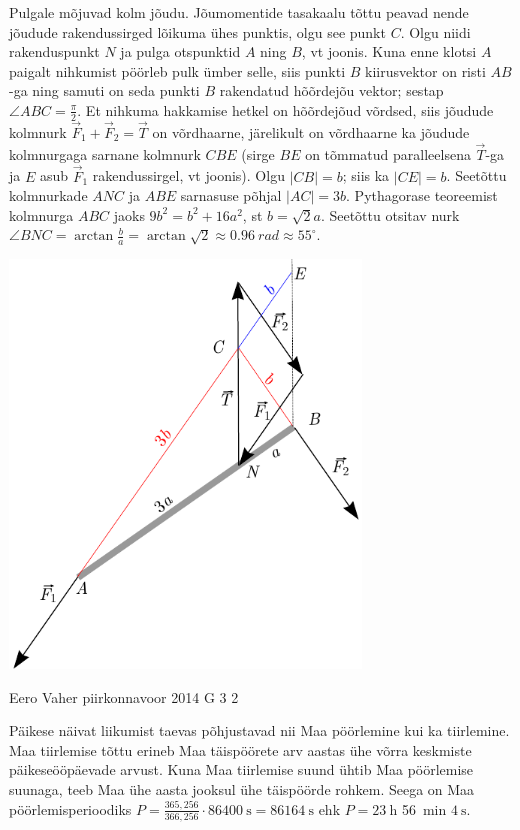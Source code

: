 \documentclass[11pt, twoside]{article}
\begin{document}
{{\ifSolution
Pulgale mõjuvad kolm jõudu. Jõumomentide tasakaalu tõttu peavad nende jõudude rakendussirged lõikuma ühes punktis, olgu see punkt $C$. Olgu niidi rakenduspunkt $N$ ja pulga otspunktid $A$ ning $B$, vt joonis. Kuna enne klotsi $A$ paigalt nihkumist pöörleb pulk ümber selle, siis punkti $B$ kiirusvektor on risti $AB$-ga ning samuti on seda punkti $B$ rakendatud hõõrdejõu vektor; sestap $\angle ABC=\frac{\pi}{2}$. Et nihkuma hakkamise hetkel on hõõrdejõud võrdsed, siis jõudude kolmnurk $\vec F_1+\vec F_2=\vec T$ on võrdhaarne, järelikult on võrdhaarne ka jõudude kolmnurgaga sarnane kolmnurk $CBE$ (sirge $BE$ on tõmmatud paralleelsena $\vec T$-ga ja $E$ asub $\vec F_1$ rakendussirgel, vt joonis).
Olgu $|CB|=b$; siis ka $|CE|=b$. Seetõttu kolmnurkade $ANC$ ja $ABE$ sarnasuse põhjal $|AC|=3b$. Pythagorase
teoreemist kolmnurga $ABC$ jaoks $9b^2=b^2+16a^2$, st $b=\sqrt 2a$. Seetõttu otsitav nurk $\angle BNC=\arctan \frac ba =\arctan \sqrt 2\approx\SI{0.96}{rad}\approx 55^\circ$.
\begin{center}
\includegraphics[width=0.7\textwidth]{2015-v3g-09-pulk_lah}
\end{center}
\fi
}

{Eero Vaher} %
{piirkonnavoor} %
{2014} %
{G 3} %
{2} %
{

\ifSolution
Päikese näivat liikumist taevas põhjustavad nii Maa pöörlemine kui ka tiirlemine. Maa tiirlemise tõttu erineb Maa täispöörete arv aastas ühe võrra keskmiste päikeseööpäevade arvust. Kuna Maa tiirlemise suund ühtib Maa pöörlemise suunaga, teeb Maa ühe aasta jooksul ühe täispöörde rohkem. Seega on Maa pöörlemisperioodiks $P=\frac{365,256}{366,256} \cdot \SI{86400}{\second}=\SI{86164}{\second}$ ehk $P=\SI{23}{\hour}$ \SI{56}{\minute} $\SI{4}{\second}$.

}}
\end{document}
